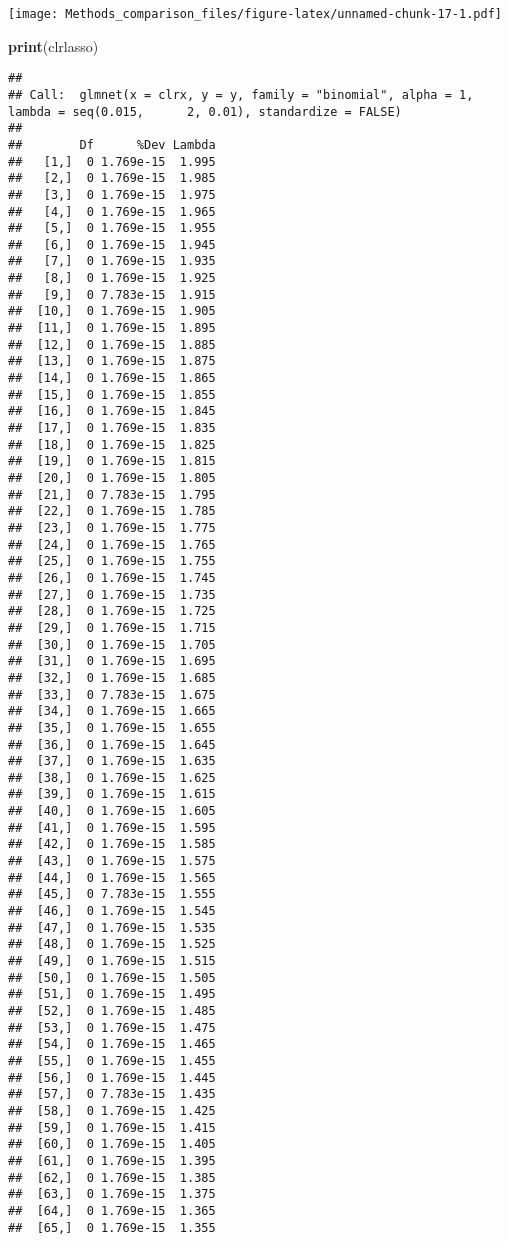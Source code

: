 \documentclass[]{book}
\newenvironment{Shaded}{\begin{snugshade}}{\end{snugshade}}
\newcommand{\KeywordTok}[1]{\textcolor[rgb]{0.13,0.29,0.53}{\textbf{#1}}}
\newcommand{\NormalTok}[1]{#1}
\begin{document}
\texttt{[image: Methods\_comparison\_files/figure-latex/unnamed-chunk-17-1.pdf]}

\begin{Shaded}
\begin{Highlighting}[]
\KeywordTok{print}\NormalTok{(clrlasso)}
\end{Highlighting}
\end{Shaded}

\begin{verbatim}
## 
## Call:  glmnet(x = clrx, y = y, family = "binomial", alpha = 1, lambda = seq(0.015,      2, 0.01), standardize = FALSE) 
## 
##        Df      %Dev Lambda
##   [1,]  0 1.769e-15  1.995
##   [2,]  0 1.769e-15  1.985
##   [3,]  0 1.769e-15  1.975
##   [4,]  0 1.769e-15  1.965
##   [5,]  0 1.769e-15  1.955
##   [6,]  0 1.769e-15  1.945
##   [7,]  0 1.769e-15  1.935
##   [8,]  0 1.769e-15  1.925
##   [9,]  0 7.783e-15  1.915
##  [10,]  0 1.769e-15  1.905
##  [11,]  0 1.769e-15  1.895
##  [12,]  0 1.769e-15  1.885
##  [13,]  0 1.769e-15  1.875
##  [14,]  0 1.769e-15  1.865
##  [15,]  0 1.769e-15  1.855
##  [16,]  0 1.769e-15  1.845
##  [17,]  0 1.769e-15  1.835
##  [18,]  0 1.769e-15  1.825
##  [19,]  0 1.769e-15  1.815
##  [20,]  0 1.769e-15  1.805
##  [21,]  0 7.783e-15  1.795
##  [22,]  0 1.769e-15  1.785
##  [23,]  0 1.769e-15  1.775
##  [24,]  0 1.769e-15  1.765
##  [25,]  0 1.769e-15  1.755
##  [26,]  0 1.769e-15  1.745
##  [27,]  0 1.769e-15  1.735
##  [28,]  0 1.769e-15  1.725
##  [29,]  0 1.769e-15  1.715
##  [30,]  0 1.769e-15  1.705
##  [31,]  0 1.769e-15  1.695
##  [32,]  0 1.769e-15  1.685
##  [33,]  0 7.783e-15  1.675
##  [34,]  0 1.769e-15  1.665
##  [35,]  0 1.769e-15  1.655
##  [36,]  0 1.769e-15  1.645
##  [37,]  0 1.769e-15  1.635
##  [38,]  0 1.769e-15  1.625
##  [39,]  0 1.769e-15  1.615
##  [40,]  0 1.769e-15  1.605
##  [41,]  0 1.769e-15  1.595
##  [42,]  0 1.769e-15  1.585
##  [43,]  0 1.769e-15  1.575
##  [44,]  0 1.769e-15  1.565
##  [45,]  0 7.783e-15  1.555
##  [46,]  0 1.769e-15  1.545
##  [47,]  0 1.769e-15  1.535
##  [48,]  0 1.769e-15  1.525
##  [49,]  0 1.769e-15  1.515
##  [50,]  0 1.769e-15  1.505
##  [51,]  0 1.769e-15  1.495
##  [52,]  0 1.769e-15  1.485
##  [53,]  0 1.769e-15  1.475
##  [54,]  0 1.769e-15  1.465
##  [55,]  0 1.769e-15  1.455
##  [56,]  0 1.769e-15  1.445
##  [57,]  0 7.783e-15  1.435
##  [58,]  0 1.769e-15  1.425
##  [59,]  0 1.769e-15  1.415
##  [60,]  0 1.769e-15  1.405
##  [61,]  0 1.769e-15  1.395
##  [62,]  0 1.769e-15  1.385
##  [63,]  0 1.769e-15  1.375
##  [64,]  0 1.769e-15  1.365
##  [65,]  0 1.769e-15  1.355

\end{verbatim}
\end{document}
